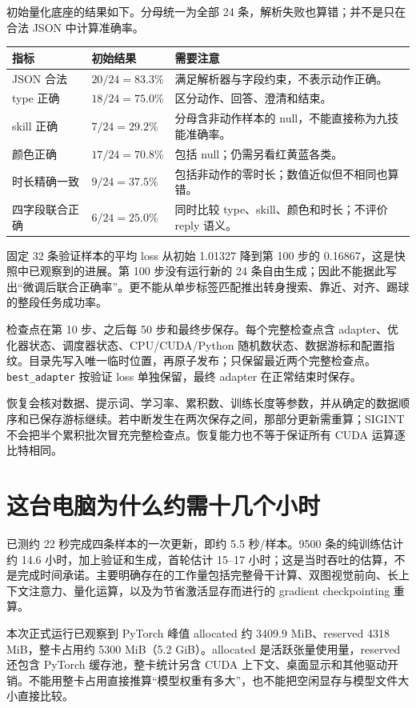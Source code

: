 初始量化底座的结果如下。分母统一为全部 24 条，解析失败也算错；并不是只在合法 JSON 中计算准确率。
\begin{longtable}{@{}>{\raggedright\arraybackslash}p{5.0cm}>{\raggedright\arraybackslash}p{3.0cm}>{\raggedright\arraybackslash}p{6.8cm}@{}}
\hline 指标 & 初始结果 & 需要注意 \\
\hline
JSON 合法 & $20/24=83.3\%$ & 满足解析器与字段约束，不表示动作正确。\\
type 正确 & $18/24=75.0\%$ & 区分动作、回答、澄清和结束。\\
skill 正确 & $7/24=29.2\%$ & 分母含非动作样本的 null，不能直接称为九技能准确率。\\
颜色正确 & $17/24=70.8\%$ & 包括 null；仍需另看红黄蓝各类。\\
时长精确一致 & $9/24=37.5\%$ & 包括非动作的零时长；数值近似但不相同也算错。\\
四字段联合正确 & $6/24=25.0\%$ & 同时比较 type、skill、颜色和时长；不评价 reply 语义。\\
\hline
\end{longtable}

固定 32 条验证样本的平均 loss 从初始 1.01327 降到第 100 步的 0.16867，这是快照中已观察到的进展。第 100 步没有运行新的 24 条自由生成；因此不能据此写出“微调后联合正确率”。更不能从单步标签匹配推出转身搜索、靠近、对齐、踢球的整段任务成功率。

检查点在第 10 步、之后每 50 步和最终步保存。每个完整检查点含 adapter、优化器状态、调度器状态、CPU/CUDA/Python 随机数状态、数据游标和配置指纹。目录先写入唯一临时位置，再原子发布；只保留最近两个完整检查点。\texttt{best\_adapter} 按验证 loss 单独保留，最终 adapter 在正常结束时保存。

恢复会核对数据、提示词、学习率、累积数、训练长度等参数，并从确定的数据顺序和已保存游标继续。若中断发生在两次保存之间，那部分更新需重算；SIGINT 不会把半个累积批次冒充完整检查点。恢复能力也不等于保证所有 CUDA 运算逐比特相同。

\section{这台电脑为什么约需十几个小时}

已测约 22 秒完成四条样本的一次更新，即约 5.5 秒/样本。9500 条的纯训练估计约 14.6 小时，加上验证和生成，首轮估计 15--17 小时；这是当时吞吐的估算，不是完成时间承诺。主要明确存在的工作量包括完整骨干计算、双图视觉前向、长上下文注意力、量化运算，以及为节省激活显存而进行的 gradient checkpointing 重算。

本次正式运行已观察到 PyTorch 峰值 allocated 约 3409.9 MiB、reserved 4318 MiB，整卡占用约 5300 MiB（5.2 GiB）。allocated 是活跃张量使用量，reserved 还包含 PyTorch 缓存池，整卡统计另含 CUDA 上下文、桌面显示和其他驱动开销。不能用整卡占用直接推算“模型权重有多大”，也不能把空闲显存与模型文件大小直接比较。

